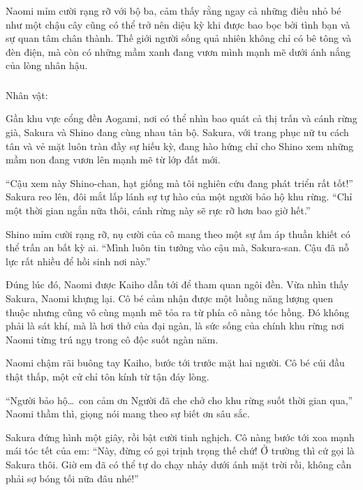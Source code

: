 \documentclass[../main.tex]{subfiles}
\begin{document}
Naomi mỉm cười rạng rỡ với bộ ba, cảm thấy rằng ngay cả những điều nhỏ bé như một chậu cây cũng có thể trở nên diệu kỳ khi được bao bọc bởi tình bạn và sự quan tâm chân thành. Thế giới người sống quả nhiên không chỉ có bê tông và đèn điện, mà còn có những mầm xanh đang vươn mình mạnh mẽ dưới ánh nắng của lòng nhân hậu.

\newpage

\subsubsection*{\label{ep-ER10}}
\begin{center}{\caviar Nhân vật:  }\end{center}

Gần khu vực cổng đền Aogami, nơi có thể nhìn bao quát cả thị trấn và cánh rừng già, Sakura và Shino đang cùng nhau tản bộ. Sakura, với trang phục nữ tu cách tân và vẻ mặt luôn tràn đầy sự hiếu kỳ, đang hào hứng chỉ cho Shino xem những mầm non đang vươn lên mạnh mẽ từ lớp đất mới.

``Cậu xem này Shino-chan, hạt giống mà tôi nghiên cứu đang phát triển rất tốt!'' Sakura reo lên, đôi mắt lấp lánh sự tự hào của một người bảo hộ khu rừng. ``Chỉ một thời gian ngắn nữa thôi, cánh rừng này sẽ rực rỡ hơn bao giờ hết.''

Shino mỉm cười rạng rỡ, nụ cười của cô mang theo một sự ấm áp thuần khiết có thể trấn an bất kỳ ai. ``Mình luôn tin tưởng vào cậu mà, Sakura-san. Cậu đã nỗ lực rất nhiều để hồi sinh nơi này.''

Đúng lúc đó, Naomi được Kaiho dẫn tới để tham quan ngôi đền. Vừa nhìn thấy Sakura, Naomi khựng lại. Cô bé cảm nhận được một luồng năng lượng quen thuộc nhưng cũng vô cùng mạnh mẽ tỏa ra từ phía cô nàng tóc hồng. Đó không phải là sát khí, mà là hơi thở của đại ngàn, là sức sống của chính khu rừng nơi Naomi từng trú ngụ trong cô độc suốt ngàn năm.

Naomi chậm rãi buông tay Kaiho, bước tới trước mặt hai người. Cô bé cúi đầu thật thấp, một cử chỉ tôn kính từ tận đáy lòng.

``Người bảo hộ\dots\ con cảm ơn Người đã che chở cho khu rừng suốt thời gian qua,'' Naomi thầm thì, giọng nói mang theo sự biết ơn sâu sắc.

Sakura đứng hình một giây, rồi bật cười tinh nghịch. Cô nàng bước tới xoa mạnh mái tóc tết của em: ``Này, đừng có gọi trịnh trọng thế chứ! Ở trường thì cứ gọi là Sakura thôi. Giờ em đã có thể tự do chạy nhảy dưới ánh mặt trời rồi, không cần phải sợ bóng tối nữa đâu nhé!''
\end{document}
